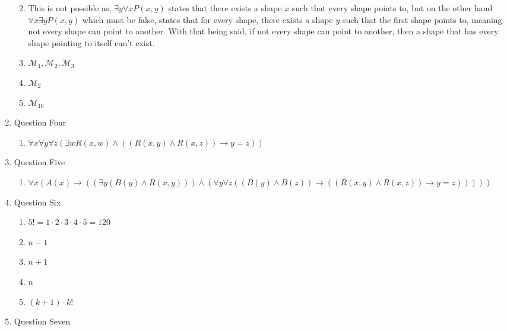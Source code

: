 \documentclass{article}
\begin{document}
\begin{enumerate}
\begin{enumerate}
        \item This is not possible as, $\exists y \forall x P(x, y)$ states that there exists a shape $x$ such that every shape points to, but on the other hand $\forall x \exists y P(x,y)$ which must be false, states that for every shape, there exists a shape $y$ such that the first shape points to, meaning not every shape can point to another. With that being said, if not every shape can point to another, then a shape that has every shape pointing to itself can't exist.
        \item $\mathcal{M}_1, \mathcal{M}_2, \mathcal{M}_3$
        \item $\mathcal{M}_2$
        \item $\mathcal{M}_{10}$
    \end{enumerate}
    \item Question Four
    \begin{enumerate}
        \item $\forall x \forall y \forall z (\exists w R(x, w) \land ((R(x,y) \land R(x,z)) \rightarrow y = z))$
    \end{enumerate}
    \item Question Five
    \begin{enumerate}
        \item $\forall x (A(x) \rightarrow ((\exists y (B(y) \land R(x,y))) \land (\forall y \forall z ((B(y) \land B(z)) \rightarrow ((R(x,y) \land R(x,z)) \rightarrow y = z)))))$
    \end{enumerate}
    \item Question Six
    \begin{enumerate}
        \item $5! = 1 \cdot 2 \cdot 3 \cdot 4 \cdot 5 = 120$
        \item $n-1$
        \item $n+1$
        \item $n$
        \item $(k+1) \cdot k!$
    \end{enumerate}
    \item Question Seven
    \begin{enumerate}

\end{enumerate}
\end{enumerate}
\end{document}
